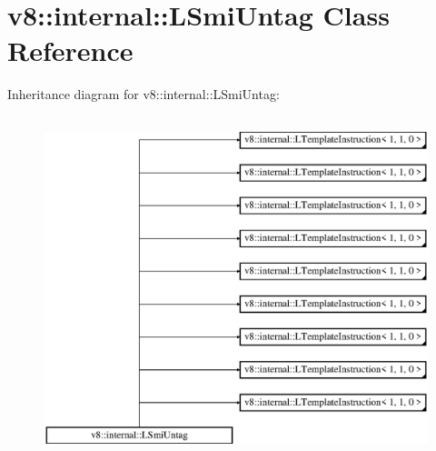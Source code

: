 \hypertarget{classv8_1_1internal_1_1_l_smi_untag}{}\section{v8\+:\+:internal\+:\+:L\+Smi\+Untag Class Reference}
\label{classv8_1_1internal_1_1_l_smi_untag}
Inheritance diagram for v8\+:\+:internal\+:\+:L\+Smi\+Untag\+:\begin{figure}[H]
\begin{center}
\leavevmode
\includegraphics[height=10.000000cm]{classv8_1_1internal_1_1_l_smi_untag}
\end{center}
\end{figure}
